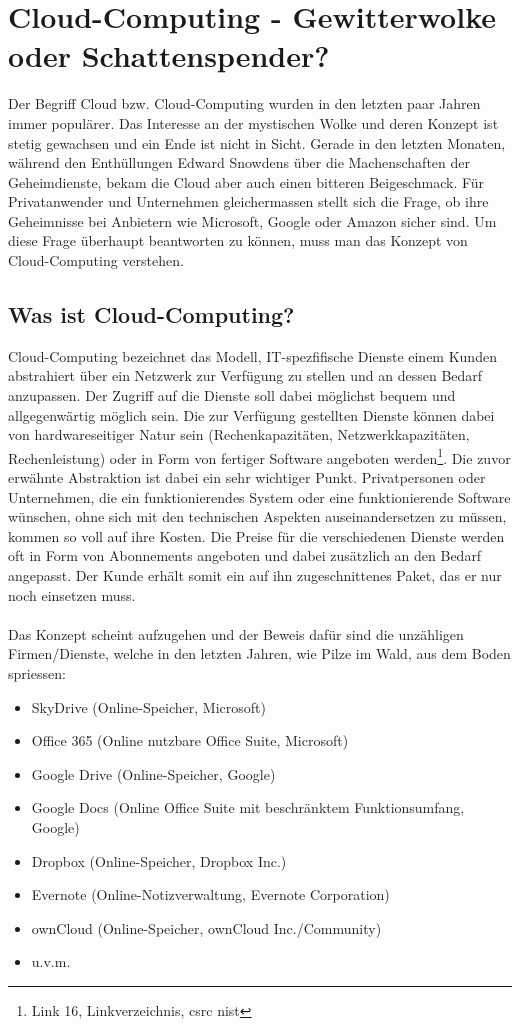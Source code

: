 \section{Cloud-Computing - Gewitterwolke oder Schattenspender?}
Der Begriff Cloud bzw. Cloud-Computing wurden in den letzten paar Jahren immer populärer. Das Interesse an der mystischen Wolke und deren Konzept ist stetig gewachsen und ein Ende ist nicht in Sicht. Gerade in den letzten Monaten, während den Enthüllungen Edward Snowdens über die Machenschaften der Geheimdienste, bekam die Cloud aber auch einen bitteren Beigeschmack. Für Privatanwender und Unternehmen gleichermassen stellt sich die Frage, ob ihre Geheimnisse bei Anbietern wie Microsoft, Google oder Amazon sicher sind. Um diese Frage überhaupt beantworten zu können, muss man das Konzept von Cloud-Computing verstehen.

\subsection{Was ist Cloud-Computing?}
Cloud-Computing bezeichnet das Modell, IT-spezfifische Dienste einem Kunden abstrahiert über ein Netzwerk zur Verfügung zu stellen und an dessen Bedarf anzupassen. Der Zugriff auf die Dienste soll dabei möglichst bequem und allgegenwärtig möglich sein. Die zur Verfügung gestellten Dienste können dabei von hardwareseitiger Natur sein (Rechenkapazitäten, Netzwerkkapazitäten, Rechenleistung) oder in Form von fertiger Software angeboten werden\footnote{Link 16, Linkverzeichnis, csrc nist}.
Die zuvor erwähnte Abstraktion ist dabei ein sehr wichtiger Punkt. Privatpersonen oder Unternehmen, die ein funktionierendes System oder eine funktionierende Software wünschen, ohne sich mit den technischen Aspekten auseinandersetzen zu müssen, kommen so voll auf ihre Kosten. Die Preise für die verschiedenen Dienste werden oft in Form von Abonnements angeboten und dabei zusätzlich an den Bedarf angepasst. Der Kunde erhält somit ein auf ihn zugeschnittenes Paket, das er nur noch einsetzen muss.
\\
\\
Das Konzept scheint aufzugehen und der Beweis dafür sind die unzähligen Firmen/Dienste, welche in den letzten Jahren, wie Pilze im Wald, aus dem Boden spriessen:
\begin{itemize}
\item SkyDrive (Online-Speicher, Microsoft)
\item Office 365 (Online nutzbare Office Suite, Microsoft)
\item Google Drive (Online-Speicher, Google)
\item Google Docs (Online Office Suite mit beschränktem Funktionsumfang, Google)
\item Dropbox (Online-Speicher, Dropbox Inc.)
\item Evernote (Online-Notizverwaltung, Evernote Corporation)
\item ownCloud (Online-Speicher, ownCloud Inc./Community)
\item u.v.m.
\end{itemize}

